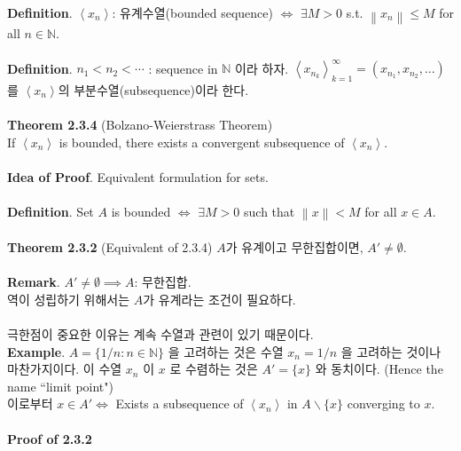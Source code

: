 \documentclass[12pt]{report}
\newcommand{\bb}[1]{\mathbb{#1}}
\newcommand{\norm}[1]{\left\lVert#1\right\rVert}
\renewcommand{\span}[1]{\left\langle #1 \right\rangle}
\newcommand{\imp}{\implies}
\newcommand{\bs}{\backslash}
\begin{document}
\textbf{Definition}. $\span{x_n}$: 유계수열(bounded sequence) $\iff$ $\exists M>0$ s.t. $\norm{x_n}\leq M$ for all $n\in \bb{N}$.\\
\\
\textbf{Definition}. $n_1<n_2<\cdots$ : sequence in $\bb{N}$ 이라 하자. $\span{x_{n_k}}_{k=1}^\infty = (x_{n_1}, x_{n_2}, \dots)$ 를 $\span{x_n}$의 부분수열(subsequence)이라 한다. \\
\\
\textbf{Theorem 2.3.4} (Bolzano-Weierstrass Theorem)\\
If $\span{x_n}$ is bounded, there exists a convergent subsequence of $\span{x_n}$.\\
\\
\textbf{Idea of Proof}. Equivalent formulation for sets.\\
\\
\textbf{Definition}. Set $A$ is bounded $\iff$ $\exists M>0$ such that $\norm{x}<M$ for all $x\in A$.\\
\\
\textbf{Theorem 2.3.2} (Equivalent of 2.3.4) $A$가 유계이고 무한집합이면, $A'\neq \emptyset$.\\
\\
\textbf{Remark}. $A'\neq \emptyset \imp A$: 무한집합.\\
역이 성립하기 위해서는 $A$가 유계라는 조건이 필요하다.\\
\\
극한점이 중요한 이유는 계속 수열과 관련이 있기 때문이다.\\
\textbf{Example}. $A = \{1/n: n\in \bb{N}\}$ 을 고려하는 것은 수열 $x_n=1/n$ 을 고려하는 것이나 마찬가지이다. 이 수열 $x_n$ 이 $x$ 로 수렴하는 것은 $A'=\{x\}$ 와 동치이다. (Hence the name ``limit point")\\
이로부터 $x\in A' \iff $ Exists a subsequence of $\span{x_n}$ in $A\bs \{x\}$ converging to $x$.\\
\\
\textbf{Proof of 2.3.2}
\end{document}
